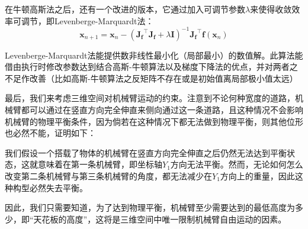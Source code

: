 \documentclass[conference]{IEEEtran}
\begin{document}
\begin{enumerate}
    在牛顿高斯法之后，还有一个改进的版本，它通过加入可调节参数$\lambda$来使得收敛效率可调节，即Levenberge-Marquardt法：
    \begin{equation}
        \boldsymbol{x}_{n+1}=\boldsymbol{x}_n-(\boldsymbol{J_f}^\intercal\boldsymbol{J_f}+\lambda\boldsymbol{I})^{-1}\boldsymbol{J_f}^\intercal\boldsymbol{f}(\boldsymbol{x}_n)
    \end{equation}

    Levenberge-Marquardt法能提供数非线性最小化（局部最小）的数值解。此算法能借由执行时修改参数达到结合高斯-牛顿算法以及梯度下降法的优点，并对两者之不足作改善（比如高斯-牛顿算法之反矩阵不存在或是初始值离局部极小值太远）

    最后，我们来考虑三维空间对机械臂运动的约束。注意到不论何种宽度的道路，机械臂都可以通过在竖直方向完全伸直来侧向通过这一条道路，且这种情况不会影响机械臂的物理平衡条件，因为倘若在这种情况下都无法做到物理平衡，则其他位形也必然不能，证明如下：

    我们假设一个搭载了物体的机械臂在竖直方向完全伸直之后仍然无法达到平衡状态，这就意味着在第一条机械臂，即坐标轴$Y_1$方向无法平衡。然而，无论如何怎么改变第二条机械臂与第三条机械臂的角度，都无法减少在$Y_1$方向上的重量，因此这种构型必然失去平衡。

    因此，我们只需要知道，为了达到物理平衡，机械臂至少需要达到的最低高度为多少，即“天花板的高度”，这将是三维空间中唯一限制机械臂自由运动的因素。
\end{enumerate}
\end{document}
